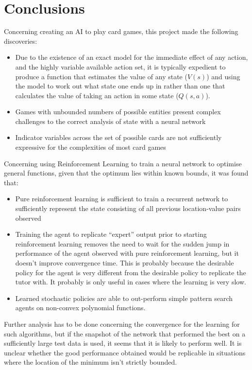 \section{Conclusions}
Concerning creating an AI to play card games, this project made the following discoveries:
\begin{itemize}
\item Due to the existence of an exact model for the immediate effect of any action, and the highly variable available action set, it is typically expedient to produce a function that estimates the value of any state ($V(s)$) and using the model to work out what state one ends up in rather than one that calculates the value of taking an action in some state ($Q(s,a)$).
\item Games with unbounded numbers of possible entities present complex challenges to the correct analysis of state with a neural network 
\item Indicator variables across the set of possible cards are not sufficiently expressive for the complexities of most card games
\end{itemize}



Concerning using Reinforcement Learning to train a  neural network to optimise general functions, given that the optimum lies within known bounds, it was found that:
\begin{itemize}
\item Pure reinforcement learning is sufficient to train a recurrent network to sufficiently represent the state consisting of all previous location-value pairs observed
\item Training the agent to replicate ``expert'' output prior to starting reinforcement learning removes the need to wait for the sudden jump in performance of the agent observed with pure reinforcement learning, but it doesn't improve convergence time. This is probably because the desirable policy for the agent is very different from the desirable policy to replicate the tutor with. It probably is only useful in cases where the learning is very slow.
\item Learned stochastic policies are able to out-perform simple pattern search agents on non-convex polynomial functions.
\end{itemize}
Further analysis has to be done concerning the convergence for the learning for such algorithms, but if the snapshot of the network that performed the best on a sufficiently large test data is used, it seems that it is likely to perform well. It is unclear whether the good performance obtained would be replicable in situations where the location of the minimum isn't strictly bounded.

